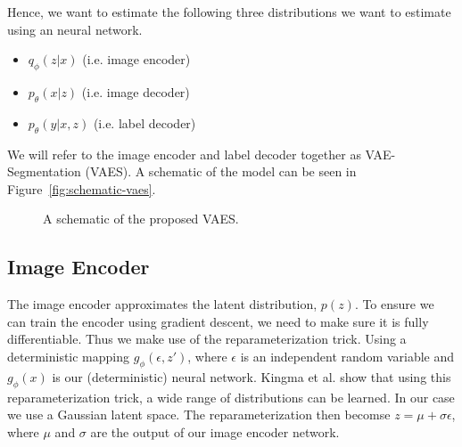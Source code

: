 Hence, we want to estimate the following three distributions we want to estimate using an neural network.
\begin{itemize}
    \item $q_\phi(z|x)$ (i.e. image encoder)
    \item $p_\theta(x|z)$ (i.e. image decoder)
    \item $p_\theta(y|x, z)$ (i.e. label decoder)
\end{itemize}
We will refer to the image encoder and label decoder together as VAE-Segmentation (VAES). A schematic of the model can be seen in Figure~\ref{fig:schematic-vaes}.

\begin{figure}[h]
    \centering
    \hphantom{space}
    \caption{A schematic of the proposed VAES.}
\end{figure}

\subsection{Image Encoder}
The image encoder approximates the latent distribution, $p(z)$. To ensure we can train the encoder using gradient descent, we need to make sure it is fully differentiable. Thus we make use of the reparameterization trick. Using a deterministic mapping $g_\phi(\epsilon, z')$, where $\epsilon$ is an independent random variable and $g_\phi(x)$ is our (deterministic) neural network. Kingma et al. show that using this reparameterization trick, a wide range of distributions can be learned. In our case we use a Gaussian latent space. The reparameterization then becomse $z = \mu + \sigma \epsilon$, where $\mu$ and $\sigma$ are the output of our image encoder network.

